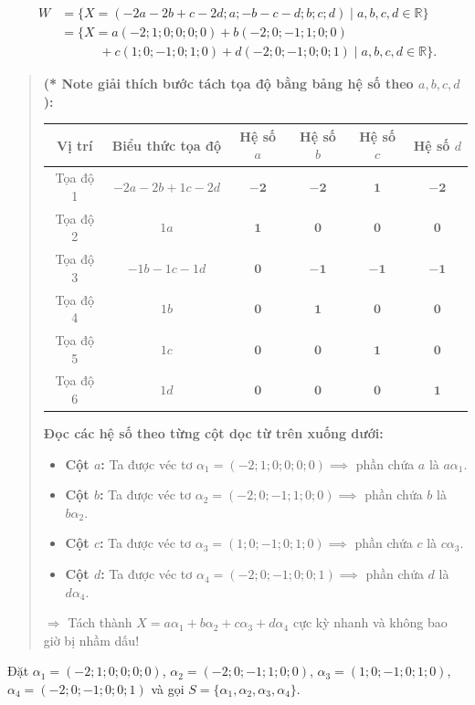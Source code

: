 \documentclass[12pt,a4paper]{article}
\newcommand{\R}{\mathbb{R}}
\begin{document}
\begin{align*}
W &= \{ X = (-2a - 2b + c - 2d; a; -b - c - d; b; c; d) \mid a, b, c, d \in \R \} \\
  &= \{ X = a(-2; 1; 0; 0; 0; 0) + b(-2; 0; -1; 1; 0; 0) \\
  &\qquad\quad + c(1; 0; -1; 0; 1; 0) + d(-2; 0; -1; 0; 0; 1) \mid a, b, c, d \in \R \}.
\end{align*}
\begin{quote}
\small\textbf{(* Note giải thích bước tách tọa độ bằng bảng hệ số theo $a, b, c, d$):}
\begin{center}
\renewcommand{\arraystretch}{1.15}
\setlength{\tabcolsep}{5pt}
\footnotesize
\begin{tabular}{|c|c|c|c|c|c|}
\hline
\textbf{Vị trí} & \textbf{Biểu thức tọa độ} & \textbf{Hệ số $a$} & \textbf{Hệ số $b$} & \textbf{Hệ số $c$} & \textbf{Hệ số $d$} \\
\hline
Tọa độ 1 & $-2a - 2b + 1c - 2d$ & $\mathbf{-2}$ & $\mathbf{-2}$ & $\mathbf{1}$ & $\mathbf{-2}$ \\
\hline
Tọa độ 2 & $1a$ & $\mathbf{1}$ & $\mathbf{0}$ & $\mathbf{0}$ & $\mathbf{0}$ \\
\hline
Tọa độ 3 & $-1b - 1c - 1d$ & $\mathbf{0}$ & $\mathbf{-1}$ & $\mathbf{-1}$ & $\mathbf{-1}$ \\
\hline
Tọa độ 4 & $1b$ & $\mathbf{0}$ & $\mathbf{1}$ & $\mathbf{0}$ & $\mathbf{0}$ \\
\hline
Tọa độ 5 & $1c$ & $\mathbf{0}$ & $\mathbf{0}$ & $\mathbf{1}$ & $\mathbf{0}$ \\
\hline
Tọa độ 6 & $1d$ & $\mathbf{0}$ & $\mathbf{0}$ & $\mathbf{0}$ & $\mathbf{1}$ \\
\hline
\end{tabular}
\end{center}
\textbf{Đọc các hệ số theo từng cột dọc từ trên xuống dưới:}
\begin{itemize}[noitemsep,topsep=2pt]
\item \textbf{Cột $a$:} Ta được véc tơ $\alpha_1 = (-2; 1; 0; 0; 0; 0) \implies$ phần chứa $a$ là $a\alpha_1$.
\item \textbf{Cột $b$:} Ta được véc tơ $\alpha_2 = (-2; 0; -1; 1; 0; 0) \implies$ phần chứa $b$ là $b\alpha_2$.
\item \textbf{Cột $c$:} Ta được véc tơ $\alpha_3 = (1; 0; -1; 0; 1; 0) \implies$ phần chứa $c$ là $c\alpha_3$.
\item \textbf{Cột $d$:} Ta được véc tơ $\alpha_4 = (-2; 0; -1; 0; 0; 1) \implies$ phần chứa $d$ là $d\alpha_4$.
\end{itemize}
$\Rightarrow$ Tách thành $X = a\alpha_1 + b\alpha_2 + c\alpha_3 + d\alpha_4$ cực kỳ nhanh và không bao giờ bị nhầm dấu!
\end{quote}
Đặt $\alpha_1 = (-2; 1; 0; 0; 0; 0)$, $\alpha_2 = (-2; 0; -1; 1; 0; 0)$, $\alpha_3 = (1; 0; -1; 0; 1; 0)$, $\alpha_4 = (-2; 0; -1; 0; 0; 1)$ và gọi $S = \{ \alpha_1, \alpha_2, \alpha_3, \alpha_4 \}$.
\end{document}
